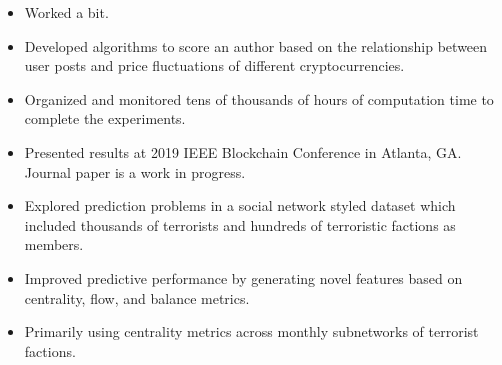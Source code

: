 \documentclass[11pt]{resume}
\begin{document}
    \begin{itemize}
        \item Worked a bit.
    \end{itemize}

    \medskip

    
    \begin{itemize}
        \item Developed algorithms to score an author based on the relationship between user posts and price fluctuations of different cryptocurrencies.
        \item Organized and monitored tens of thousands of hours of computation time to complete the experiments.
        \item Presented results at 2019 IEEE Blockchain Conference in Atlanta, GA. Journal paper is a work in progress. 
    \end{itemize}

    \divider


    \begin{itemize}
        \item Explored prediction problems in a social network styled dataset which included thousands of terrorists and hundreds of 
            terroristic factions as members.
        \item Improved predictive performance by generating novel features based on centrality, flow, and balance metrics.
            \item Primarily using centrality metrics across monthly subnetworks of terrorist factions.
    \end{itemize}
\end{document}
